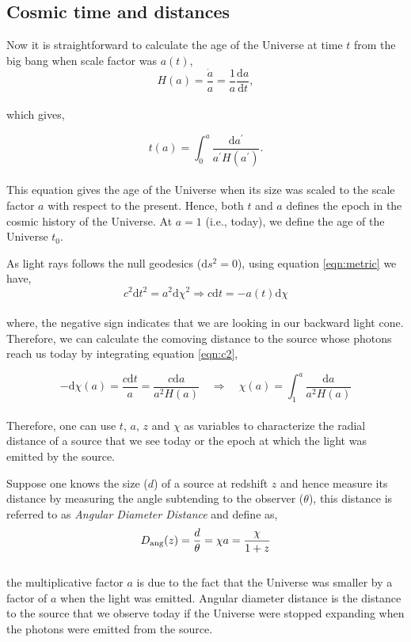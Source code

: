 \subsection{Cosmic time and distances}


Now it is straightforward to calculate the age of the Universe at time $t$ from the big bang
when scale factor was $a(t)$,
\begin{equation}
	H(a) = \dfrac{\dot{a}}{a} = \dfrac{1}{a} \dfrac{\mathrm{d}a}{\mathrm{d}t},
\end{equation}
\\
which gives,

\begin{equation}
	t(a) = \int_0^a \dfrac{\mathrm{d}a^{\prime}}{a^{\prime}H(a^{\prime})}.
\end{equation}
\\
This equation gives the age of the Universe when its size was
scaled to the scale factor $a$ with respect to the present. Hence, both $t$ and
$a$ defines the epoch in the cosmic history of the Universe. At $a=1$ (i.e., today),
we define the age of the Universe $t_0$.

As light rays follows the null geodesics ($\mathrm{d}s^2=0$), using equation 
\ref{eqn:metric} we have,
\begin{equation}
	c^2\mathrm{d}t^2 = a^2\mathrm{d}\chi^2 \Rightarrow c\mathrm{d}t = -a(t)\mathrm{d}\chi
	\label{eqn:c2}
\end{equation}
\\
where, the negative sign indicates that we are looking in our backward light cone. 
Therefore, we can calculate the comoving distance to the source whose photons reach us
today by integrating equation \ref{eqn:c2},

\begin{equation}
	-\mathrm{d}\chi(a) = \dfrac{c\mathrm{d}t}{a} = 
	 \dfrac{c\mathrm{d}a}{a^2 H(a)} \quad
	 \Rightarrow \quad \chi(a) = \int_1^a \dfrac{\mathrm{d}a}{a^2H(a)}
\end{equation}
\\
Therefore, one can use $t$, $a$, $z$ and $\chi$ as variables to characterize the
radial distance of a source that we see today or the epoch at which the light was
emitted by the source. 

Suppose one knows the size ($d$) of a source at redshift $z$ and hence measure its
distance by measuring the angle subtending to the observer ($\theta$), this distance is referred
to as {\it Angular Diameter Distance} and define as,
\begin{equation}
	D_{\rm ang}(z) = \dfrac{d}{\theta} = \chi a = \dfrac{\chi}{1+z}
\end{equation}
\\
the multiplicative factor $a$ is due to the fact that the Universe was smaller by 
a factor of $a$ when the light was emitted.  Angular diameter distance 
is the distance to the source that we observe today if the Universe were
stopped expanding when the photons were emitted from the source.

